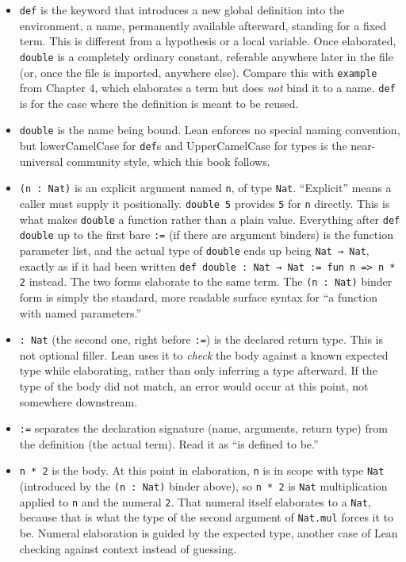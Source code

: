 \begin{itemize}
\tightlist
\item
  \texttt{def} is the keyword that introduces a new global definition into the environment, a name, permanently available afterward, standing for a fixed term. This is different from a hypothesis or a local variable. Once elaborated, \texttt{double} is a completely ordinary constant, referable anywhere later in the file (or, once the file is imported, anywhere else). Compare this with \texttt{example} from Chapter 4, which elaborates a term but does \emph{not} bind it to a name. \texttt{def} is for the case where the definition is meant to be reused.
\item
  \texttt{double} is the name being bound. Lean enforces no special naming convention, but lowerCamelCase for \texttt{def}s and UpperCamelCase for types is the near-universal community style, which this book follows.
\item
  \texttt{(n : Nat)} is an explicit argument named \texttt{n}, of type \texttt{Nat}. ``Explicit'' means a caller must supply it positionally. \texttt{double 5} provides \texttt{5} for \texttt{n} directly. This is what makes \texttt{double} a function rather than a plain value. Everything after \texttt{def double} up to the first bare \texttt{:=} (if there are argument binders) is the function parameter list, and the actual type of \texttt{double} ends up being \texttt{Nat → Nat}, exactly as if it had been written \texttt{def double : Nat → Nat := fun n => n * 2} instead. The two forms elaborate to the same term. The \texttt{(n : Nat)} binder form is simply the standard, more readable surface syntax for ``a function with named parameters.''
\item
  \texttt{: Nat} (the second one, right before \texttt{:=}) is the declared return type. This is not optional filler. Lean uses it to \emph{check} the body against a known expected type while elaborating, rather than only inferring a type afterward. If the type of the body did not match, an error would occur at this point, not somewhere downstream.
\item
  \texttt{:=} separates the declaration signature (name, arguments, return type) from the definition (the actual term). Read it as ``is defined to be.''
\item
  \texttt{n * 2} is the body. At this point in elaboration, \texttt{n} is in scope with type \texttt{Nat} (introduced by the \texttt{(n : Nat)} binder above), so \texttt{n * 2} is \texttt{Nat} multiplication applied to \texttt{n} and the numeral \texttt{2}. That numeral itself elaborates to a \texttt{Nat}, because that is what the type of the second argument of \texttt{Nat.mul} forces it to be. Numeral elaboration is guided by the expected type, another case of Lean checking against context instead of guessing.
\end{itemize}

